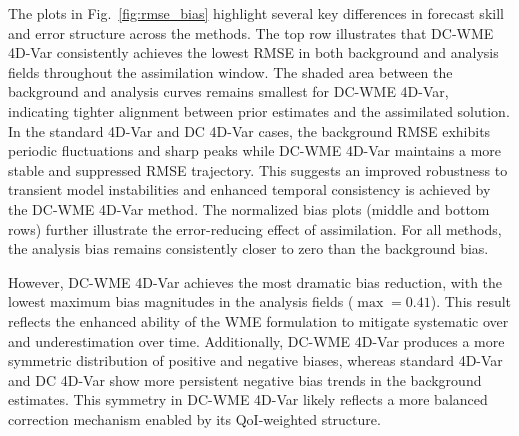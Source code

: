 \documentclass[final,1p,times]{elsarticle}
\begin{document}
The plots in Fig.~\ref{fig:rmse_bias} highlight several key differences in forecast skill and error structure across the methods. 
The top row illustrates that DC-WME 4D-Var consistently achieves the lowest RMSE in both background and analysis fields throughout the assimilation window. 
The shaded area between the background and analysis curves remains smallest for DC-WME 4D-Var, indicating tighter alignment between prior estimates and the assimilated solution. 
In the standard 4D-Var and DC 4D-Var cases, the background RMSE exhibits periodic fluctuations and sharp peaks while DC-WME 4D-Var maintains a more stable and suppressed RMSE trajectory.
This suggests an improved robustness to transient model instabilities and enhanced temporal consistency is achieved by the DC-WME 4D-Var method. 
The normalized bias plots (middle and bottom rows) further illustrate the error-reducing effect of assimilation. 
For all methods, the analysis bias remains consistently closer to zero than the background bias.

However, DC-WME 4D-Var achieves the most dramatic bias reduction, with the lowest maximum bias magnitudes in the analysis fields ($ \max = 0.41 $). 
This result reflects the enhanced ability of the WME formulation to mitigate systematic over and underestimation over time. 
Additionally, DC-WME 4D-Var produces a more symmetric distribution of positive and negative biases, whereas standard 4D-Var and DC 4D-Var show more persistent negative bias trends in the background estimates. 
This symmetry in DC-WME 4D-Var likely reflects a more balanced correction mechanism enabled by its QoI-weighted structure. 
\end{document}
